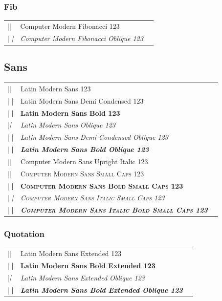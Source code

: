 \documentclass[a4paper]{article}
\makeatletter
\newenvironment{vrb}{\begin{tabular}{@{}p{5.4cm}ll@{}}}{\end{tabular}}
\makeatother
\begin{document}
\subsubsection*{Fib}

\selectfont
\begin{vrb}
|\fontfamily{cmfib}\selectfont | & {Computer Modern Fibonacci 123} \\
|  \slshape| & {\slshape Computer Modern Fibonacci Oblique 123} \\
\end{vrb}

\subsection*{Sans}

\sffamily
\begin{vrb}
|\sffamily| & {Latin Modern Sans 123} \\
|  \fontseries{sbc}\selectfont| & {\fontseries{sbc}\selectfont Latin Modern Sans Demi Condensed 123} \\
|  \bfseries| & {\bfseries Latin Modern Sans Bold 123} \\
|\slshape| & {\slshape Latin Modern Sans Oblique 123} \\
|  \fontseries{sbc}\selectfont| & {\fontseries{sbc}\selectfont\slshape Latin Modern Sans Demi Condensed Oblique 123} \\
|  \bfseries| & {\bfseries\slshape Latin Modern Sans Bold Oblique 123} \\
|\uishape| & {\uishape Computer Modern Sans Upright Italic 123} \\
|\scshape| & {\scshape Computer Modern Sans Small Caps 123} \\
|  \bfseries| & {\bfseries\scshape Computer Modern Sans Bold Small Caps 123} \\
|  \itshape| & {\itshape\scshape Computer Modern Sans Italic Small Caps 123} \\
|    \bfseries| & {\itshape\bfseries\scshape Computer Modern Sans Italic Bold Small Caps 123} \\
\end{vrb}

\subsubsection*{Quotation}

\qtstyle
\begin{vrb}
|\qtstyle | & {Latin Modern Sans Extended 123} \\
|  \bfseries | & {\bfseries Latin Modern Sans Bold Extended 123} \\
|\slshape | & {\slshape Latin Modern Sans Extended Oblique 123} \\
|  \bfseries | & {\bfseries\slshape Latin Modern Sans Bold Extended Oblique 123} \\
\end{vrb}
\end{document}
